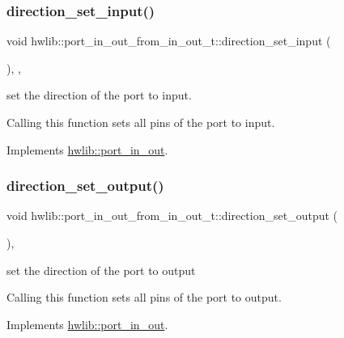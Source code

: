 \subsubsection{\texorpdfstring{direction\+\_\+set\+\_\+input()}{direction\_set\_input()}}
{\footnotesize\ttfamily void hwlib\+::port\+\_\+in\+\_\+out\+\_\+from\+\_\+in\+\_\+out\+\_\+t\+::direction\+\_\+set\+\_\+input (\begin{DoxyParamCaption}{ }\end{DoxyParamCaption})\hspace{0.3cm}{\ttfamily [inline]}, {\ttfamily [override]}, {\ttfamily [virtual]}}

set the direction of the port to input.

Calling this function sets all pins of the port to input. 

Implements \hyperlink{classhwlib_1_1port__in__out_ac7a9611410ddb9fd5d8e2dd15bff0a3f}{hwlib\+::port\+\_\+in\+\_\+out}.

\mbox{\label{classhwlib_1_1port__in__out__from__in__out__t_aa148c50e132f6657d4c3a292b91896da}} 
\subsubsection{\texorpdfstring{direction\+\_\+set\+\_\+output()}{direction\_set\_output()}}
{\footnotesize\ttfamily void hwlib\+::port\+\_\+in\+\_\+out\+\_\+from\+\_\+in\+\_\+out\+\_\+t\+::direction\+\_\+set\+\_\+output (\begin{DoxyParamCaption}{ }\end{DoxyParamCaption})\hspace{0.3cm}{\ttfamily [inline]}, {\ttfamily [virtual]}}

set the direction of the port to output

Calling this function sets all pins of the port to output. 

Implements \hyperlink{classhwlib_1_1port__in__out_a515b4a6bbde4f2df5bb11cda41234fe4}{hwlib\+::port\+\_\+in\+\_\+out}.

